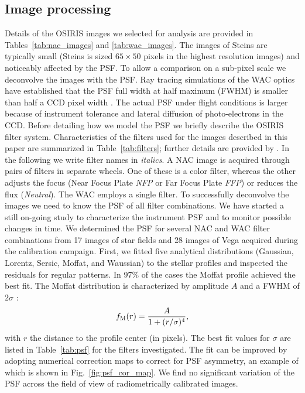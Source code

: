 \documentclass[preprint,3p,authoryear]{elsarticle}
\begin{document}
\subsection{Image processing}

Details of the OSIRIS images we selected for analysis are provided in Tables~\ref{tab:nac_images} and \ref{tab:wac_images}. The images of Steins are typically small (Steins is sized $65\times50$ pixels in the highest resolution images) and noticeably affected by the PSF. To allow a comparison on a sub-pixel scale we deconvolve the images with the PSF. Ray tracing simulations of the WAC optics have established that the PSF full width at half maximum (FWHM) is smaller than half a CCD pixel width \citep{D04}. The actual PSF under flight conditions is larger because of instrument tolerance and lateral diffusion of photo-electrons in the CCD. Before detailing how we model the PSF we briefly describe the OSIRIS filter system. Characteristics of the filters used for the images described in this paper are summarized in Table~\ref{tab:filters}; further details are provided by \citealt{K07}. In the following we write filter names in {\it italics}. A NAC image is acquired through pairs of filters in separate wheels. One of these is a color filter, whereas the other adjusts the focus (Near Focus Plate {\it NFP} or Far Focus Plate {\it FFP}) or reduces the flux ({\it Neutral}). The WAC employs a single filter. To successfully deconvolve the images we need to know the PSF of all filter combinations. We have started a still on-going study to characterize the instrument PSF and to monitor possible changes in time. We determined the PSF for several NAC and WAC filter combinations from 17 images of star fields and 28 images of Vega acquired during the calibration campaign. First, we fitted five analytical distributions (Gaussian, Lorentz, Sersic, Moffat, and Waussian) to the stellar profiles and inspected the residuals for regular patterns. In 97\% of the cases the Moffat profile achieved the best fit. The Moffat distribution is characterized by amplitude $A$ and a FWHM of $2 \sigma$ \citep{M69}:
\begin{equation}
f_{\rm M}(r) = \frac{A}{1 + (r / \sigma)^4},
\label{eq:Moffat}
\end{equation}
with $r$ the distance to the profile center (in pixels). The best fit values for $\sigma$ are listed in Table~\ref{tab:psf} for the filters investigated. The fit can be improved by adopting numerical correction maps to correct for PSF asymmetry, an example of which is shown in Fig.~\ref{fig:psf_cor_map}. We find no significant variation of the PSF across the field of view of radiometrically calibrated images.
\end{document}
